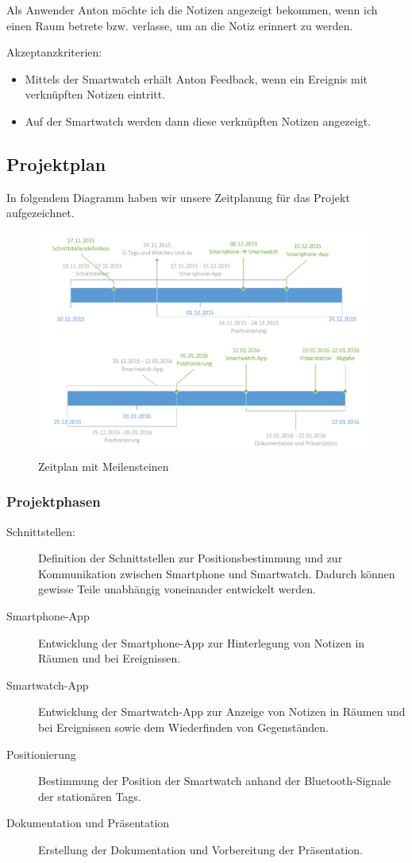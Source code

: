 Als Anwender Anton möchte ich die Notizen angezeigt bekommen, wenn ich einen Raum betrete bzw. verlasse, um an die Notiz erinnert zu werden.

Akzeptanzkriterien:
\begin{itemize}
\item Mittels der Smartwatch erhält Anton Feedback, wenn ein Ereignis mit verknüpften Notizen eintritt.
\item Auf der Smartwatch werden dann diese verknüpften Notizen angezeigt.
\end{itemize}


\subsection{Projektplan}

In folgendem Diagramm haben wir unsere Zeitplanung für das Projekt aufgezeichnet.

\begin{figure}[tbh]
\centering
\includegraphics[width=1.0\linewidth]{Bilder/Zeitplan-1}
\caption{Zeitplan mit Meilensteinen}
\label{fig:Zeitplan-1}
\end{figure}

\subsubsection{Projektphasen}
\begin{description}
	\item[Schnittstellen:] Definition der Schnittstellen zur Positionsbestimmung und zur Kommunikation zwischen
	Smartphone und Smartwatch. Dadurch können gewisse Teile unabhängig voneinander entwickelt werden.
	\item[Smartphone-App] Entwicklung der Smartphone-App zur Hinterlegung von Notizen in Räumen und bei Ereignissen.
	\item[Smartwatch-App] Entwicklung der Smartwatch-App zur Anzeige von Notizen in Räumen und bei Ereignissen sowie
	dem Wiederfinden von Gegenständen.
	\item[Positionierung] Bestimmung der Position der Smartwatch anhand der Bluetooth-Signale der stationären Tags.
	\item[Dokumentation und Präsentation] Erstellung der Dokumentation und Vorbereitung der Präsentation.
\end{description}

